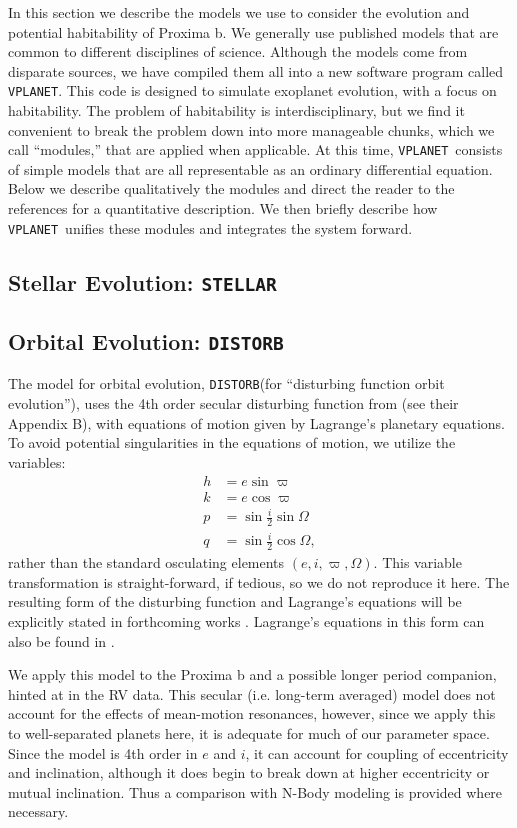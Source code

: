 \documentclass[preprint,12pt]{aastex}
\def\vplanet{\texttt{\footnotesize{VPLANET}}}
\def\distorb{\texttt{\footnotesize{DISTORB}}}
\def\stellar{\texttt{\footnotesize{STELLAR}}}
\begin{document}
In this section we describe the models we use to consider the
evolution and potential habitability of Proxima b. We generally use
published models that are common to different disciplines of
science. Although the models come from disparate sources, we have
compiled them all into a new software program called \vplanet. This
code is designed to simulate exoplanet evolution, with a focus on
habitability. The problem of habitability is interdisciplinary, but we
find it convenient to break the problem down into more manageable
chunks, which we call ``modules,'' that are applied when
applicable. At this time, \vplanet~consists of simple models that are
all representable as an ordinary differential equation. Below we
describe qualitatively the modules and direct the reader to the
references for a quantitative description. We then briefly describe
how \vplanet~unifies these modules and integrates the system forward.

\subsection{Stellar Evolution: \stellar}

\subsection{Orbital Evolution: \distorb}
The model for orbital evolution, \distorb (for ``disturbing function orbit evolution''), uses the 4th order secular disturbing function from \cite{MurrayDermott99} (see their Appendix B), with equations of motion given by Lagrange's planetary equations. To avoid potential singularities in the equations of motion, we utilize the variables:
\begin{align}
h & = e \sin{\varpi} \\
k & = e \cos{\varpi} \\
p & = \sin{\frac{i}{2}} \sin{\Omega} \label{eqnp}\\
q & = \sin{\frac{i}{2}} \cos{\Omega} \label{eqnq},
\end{align}
rather than the standard osculating elements $(e,i,\varpi,\Omega)$. This variable transformation is straight-forward, if tedious, so we do not reproduce it here. The resulting form of the disturbing function and Lagrange's equations will be explicitly stated in forthcoming works \citep{Barnes2016, Deitrick2016}. Lagrange's equations in this form can also be found in \cite{Berger1991}. 

We apply this model to the Proxima b and a possible longer period companion, hinted at in the RV data. This secular (i.e. long-term averaged) model does not account for the effects of mean-motion resonances, however, since we apply this to well-separated planets here, it is adequate for much of our parameter space. Since the model is 4th order in $e$ and $i$, it can account for coupling of eccentricity and inclination, although it does begin to break down at higher eccentricity or mutual inclination. Thus a comparison with N-Body modeling is provided where necessary. 
\end{document}
